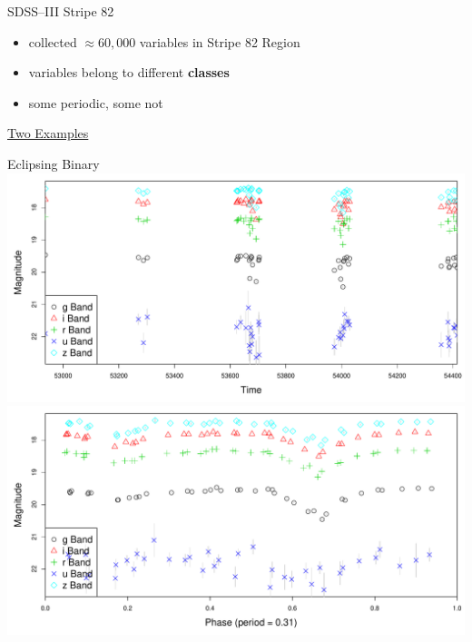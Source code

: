 \documentclass[12pt]{beamer}
\begin{document}
\begin{frame}{SDSS--III Stripe 82 \cite{ivezic2007sloan}}
\begin{itemize}
\item collected $\approx 60,000$ variables in Stripe 82 Region
\item variables belong to different \textbf{classes}
\item some periodic, some not
\end{itemize}


\underline{Two Examples}

\vspace{-.2in}

\begin{center}
Eclipsing Binary\\
\includegraphics[scale=.15]{figs/unfolded_4183016.pdf}
\includegraphics[scale=.15]{figs/folded_4183016.pdf}
\end{center}

\vspace{-.2in}




\end{frame}
\end{document}
